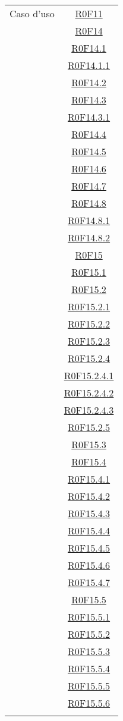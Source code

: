 \documentclass[../AnalisiDeiRequisiti.tex]{subfiles}
\begin{document}
\begin{longtable}{|c|c|}
	Caso d'uso & \hyperlink{R0F11}{R0F11}\\& \hyperlink{R0F14}{R0F14}\\& \hyperlink{R0F14.1}{R0F14.1}\\& \hyperlink{R0F14.1.1}{R0F14.1.1}\\& \hyperlink{R0F14.2}{R0F14.2}\\& \hyperlink{R0F14.3}{R0F14.3}\\& \hyperlink{R0F14.3.1}{R0F14.3.1}\\& \hyperlink{R0F14.4}{R0F14.4}\\& \hyperlink{R0F14.5}{R0F14.5}\\& \hyperlink{R0F14.6}{R0F14.6}\\& \hyperlink{R0F14.7}{R0F14.7}\\& \hyperlink{R0F14.8}{R0F14.8}\\& \hyperlink{R0F14.8.1}{R0F14.8.1}\\& \hyperlink{R0F14.8.2}{R0F14.8.2}\\& \hyperlink{R0F15}{R0F15}\\& \hyperlink{R0F15.1}{R0F15.1}\\& \hyperlink{R0F15.2}{R0F15.2}\\& \hyperlink{R0F15.2.1}{R0F15.2.1}\\& \hyperlink{R0F15.2.2}{R0F15.2.2}\\& \hyperlink{R0F15.2.3}{R0F15.2.3}\\& \hyperlink{R0F15.2.4}{R0F15.2.4}\\& \hyperlink{R0F15.2.4.1}{R0F15.2.4.1}\\& \hyperlink{R0F15.2.4.2}{R0F15.2.4.2}\\& \hyperlink{R0F15.2.4.3}{R0F15.2.4.3}\\& \hyperlink{R0F15.2.5}{R0F15.2.5}\\& \hyperlink{R0F15.3}{R0F15.3}\\& \hyperlink{R0F15.4}{R0F15.4}\\& \hyperlink{R0F15.4.1}{R0F15.4.1}\\& \hyperlink{R0F15.4.2}{R0F15.4.2}\\& \hyperlink{R0F15.4.3}{R0F15.4.3}\\& \hyperlink{R0F15.4.4}{R0F15.4.4}\\& \hyperlink{R0F15.4.5}{R0F15.4.5}\\& \hyperlink{R0F15.4.6}{R0F15.4.6}\\& \hyperlink{R0F15.4.7}{R0F15.4.7}\\& \hyperlink{R0F15.5}{R0F15.5}\\& \hyperlink{R0F15.5.1}{R0F15.5.1}\\& \hyperlink{R0F15.5.2}{R0F15.5.2}\\& \hyperlink{R0F15.5.3}{R0F15.5.3}\\& \hyperlink{R0F15.5.4}{R0F15.5.4}\\& \hyperlink{R0F15.5.5}{R0F15.5.5}\\& \hyperlink{R0F15.5.6}{R0F15.5.6}\\& 
\end{longtable}
\end{document}
